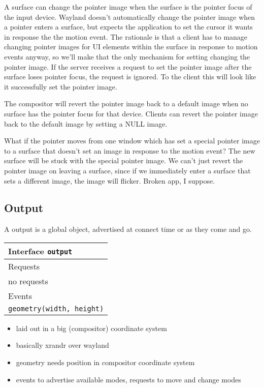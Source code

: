 \documentclass{article}
\begin{document}
A surface can change the pointer image when the surface is the pointer
focus of the input device.  Wayland doesn't automatically change the
pointer image when a pointer enters a surface, but expects the
application to set the cursor it wants in response the the motion
event.  The rationale is that a client has to manage changing pointer
images for UI elements within the surface in response to motion events
anyway, so we'll make that the only mechanism for setting changing the
pointer image.  If the server receives a request to set the pointer
image after the surface loses pointer focus, the request is ignored.
To the client this will look like it successfully set the pointer
image.

The compositor will revert the pointer image back to a default image
when no surface has the pointer focus for that device.  Clients can
revert the pointer image back to the default image by setting a NULL
image.

What if the pointer moves from one window which has set a special
pointer image to a surface that doesn't set an image in response to
the motion event?  The new surface will be stuck with the special
pointer image.  We can't just revert the pointer image on leaving a
surface, since if we immediately enter a surface that sets a different
image, the image will flicker.  Broken app, I suppose.

\subsection{Output}

A output is a global object, advertised at connect time or as they
come and go.

\begin{tabular}{l}
  \hline 
  Interface \texttt{output} \\ \hline 
  Requests \\ \hline 
  no requests \\ \hline
  Events \\ \hline
  \texttt{geometry(width, height)} \\ \hline
\end{tabular}

\begin{itemize}
\item laid out in a big (compositor) coordinate system
\item basically xrandr over wayland
\item geometry needs position in compositor coordinate system\
\item events to advertise available modes, requests to move and change
  modes
\end{itemize}
\end{document}
